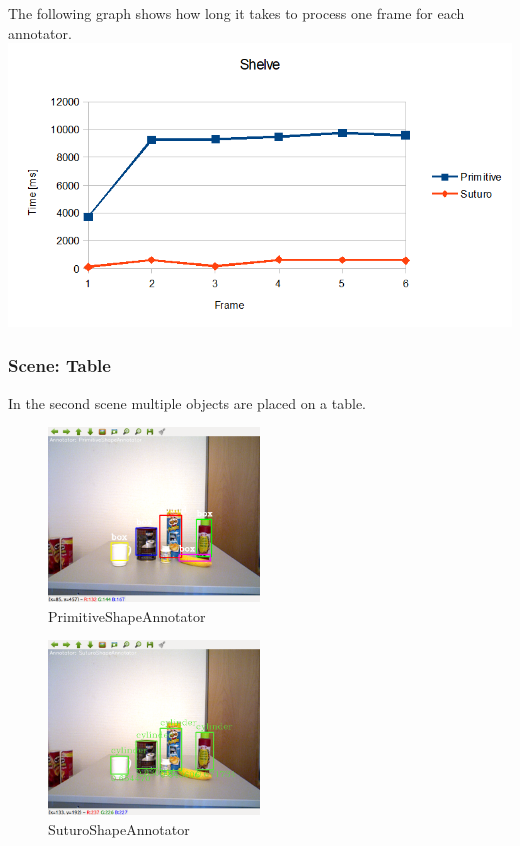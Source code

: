 \documentclass[main.tex]{subfiles}
\begin{document}
The following graph shows how long it takes to process one frame for each annotator.
{\center
  \includegraphics[width=1.2\textwidth]{pictures/perception/shape_annotator/classification_test_shelve/chart.png}
}
\newpage

\subsubsection{Scene: Table}
In the second scene multiple objects are placed on a table.
\begin{figure}
  \center
  \includegraphics[width=0.5\textwidth]{pictures/perception/shape_annotator/classification_test_table/primitive.png}
  \caption{PrimitiveShapeAnnotator}
  \label{fig:shapeAnnotatorShelvePrimitive}
\end{figure}
\begin{figure}
  \center
  \includegraphics[width=0.5\textwidth]{pictures/perception/shape_annotator/classification_test_table/suturo.png}
  \caption{SuturoShapeAnnotator}
  \label{fig:shapeAnnotatorShelveSuturo}
\end{figure}
\end{document}
